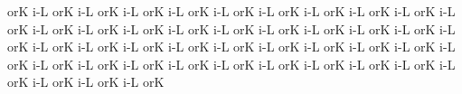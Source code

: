 \spatium
{}or\punctum K\egn
\sgn {}i-\punctum L\egn
\spatium
{}or\punctum K\egn
\sgn {}i-\punctum L\egn
\spatium
{}or\punctum K\egn
\sgn {}i-\punctum L\egn
\spatium
{}or\punctum K\egn
\sgn {}i-\punctum L\egn
\spatium
{}or\punctum K\egn
\sgn {}i-\punctum L\egn
\spatium
{}or\punctum K\egn
\sgn {}i-\punctum L\egn
\spatium
{}or\punctum K\egn
\sgn {}i-\punctum L\egn
\spatium
{}or\punctum K\egn
\sgn {}i-\punctum L\egn
\spatium
{}or\punctum K\egn
\sgn {}i-\punctum L\egn
\spatium
{}or\punctum K\egn
\sgn {}i-\punctum L\egn
\spatium
{}or\punctum K\egn
\sgn {}i-\punctum L\egn
\spatium
{}or\punctum K\egn
\sgn {}i-\punctum L\egn
\spatium
\lineaproxima
{}or\punctum K\egn
\sgn {}i-\punctum L\egn
\spatium
{}or\punctum K\egn
\sgn {}i-\punctum L\egn
\spatium
{}or\punctum K\egn
\sgn {}i-\punctum L\egn
\spatium
{}or\punctum K\egn
\sgn {}i-\punctum L\egn
\spatium
{}or\punctum K\egn
\sgn {}i-\punctum L\egn
\spatium
{}or\punctum K\egn
\sgn {}i-\punctum L\egn
\spatium
{}or\punctum K\egn
\sgn {}i-\punctum L\egn
\spatium
{}or\punctum K\egn
\sgn {}i-\punctum L\egn
\spatium
{}or\punctum K\egn
\sgn {}i-\punctum L\egn
\spatium
{}or\punctum K\egn
\sgn {}i-\punctum L\egn
\spatium
{}or\punctum K\egn
\sgn {}i-\punctum L\egn
\spatium
{}or\punctum K\egn
\sgn {}i-\punctum L\egn
\spatium
{}or\punctum K\egn
\sgn {}i-\punctum L\egn
\spatium
{}or\punctum K\egn
\sgn {}i-\punctum L\egn
\spatium
{}or\punctum K\egn
\sgn {}i-\punctum L\egn
\spatium
{}or\punctum K\egn
\sgn {}i-\punctum L\egn
\spatium
{}or\punctum K\egn
\sgn {}i-\punctum L\egn
\spatium
{}or\punctum K\egn
\sgn {}i-\punctum L\egn
\spatium
\lineaproxima
{}or\punctum K\egn
\sgn {}i-\punctum L\egn
\spatium
{}or\punctum K\egn
\sgn {}i-\punctum L\egn
\spatium
{}or\punctum K\egn
\sgn {}i-\punctum L\egn
\spatium
{}or\punctum K\egn
\sgn {}i-\punctum L\egn
\spatium
{}or\punctum K\egn
\sgn {}i-\punctum L\egn
\spatium
{}or\punctum K\egn
\sgn {}i-\punctum L\egn
\spatium
{}or\punctum K\egn
\sgn {}i-\punctum L\egn
\spatium
{}or\punctum K\egn
\sgn {}i-\punctum L\egn
\spatium
{}or\punctum K\egn
\sgn {}i-\punctum L\egn
\spatium
{}or\punctum K\egn
\sgn {}i-\punctum L\egn
\spatium
{}or\punctum K\egn
\sgn {}i-\punctum L\egn
\spatium
{}or\punctum K\egn
\sgn {}i-\punctum L\egn
\spatium
{}or\punctum K\egn
\sgn {}i-\punctum L\egn
\spatium
{}or\punctum K\egn
